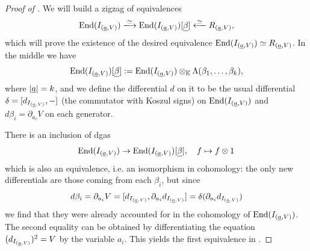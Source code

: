 \begin{proof}[Proof of ]
	We will build a zigzag of equivalences
	\begin{equation} \label{eqn:zigzag}
		 \End(I_{(\undl{a}, V)}) \xlra{\simeq} \End(I_{(\undl{a}, V)})[\undl{\beta}] \xlla{\simeq} R_{(\undl{a}, V)},
	\end{equation}
	which will prove the existence of the desired equivalence $\mathrm{End}(I_{(\underline{a}, V)}) \simeq R_{(\underline{a}, V)}$. In the middle we have
	\begin{equation*}
		\mathrm{End}(I_{(\underline{a}, V)})[\underline{\beta}] := \mathrm{End}(I_{(\underline{a}, V)}) \otimes_{\mathbb{K}} \Lambda(\beta_1, \dotsc, \beta_k),
	\end{equation*}
	where $\left\lvert \underline{a} \right\rvert = k$, and we define the differential $d$ on it to be the usual differential $\delta = [d_{I_{(\underline{a},V)}}, -]$ (the commutator with Koszul signs) on $\mathrm{End}(I_{(\underline{a}, V)})$ and $d\beta_i = \partial_{a_i} V$ on each generator.
	
	There is an inclusion of dgas
	\begin{equation*}
		\mathrm{End}(I_{(\underline{a}, V)}) \to \mathrm{End}(I_{(\underline{a}, V)})[\underline{\beta}], \quad f \mapsto f \otimes 1
	\end{equation*}
	which is also an equivalence, i.e. an isomorphism in cohomology: the only new differentials are those coming from each $\beta_i$, but since
	\begin{equation*}
		d \beta_i = \partial_{a_i} V = [d_{I_{(\underline{a},V)}}, \partial_{a_i} d_{I_{(\underline{a},V)}}] = \delta( \partial_{a_i} d_{I_{(\underline{a},V)}} )
	\end{equation*}
	we find that they were already accounted for in the cohomology of $\mathrm{End}(I_{(\underline{a}, V)})$. The second equality can be obtained by differentiating the equation $(d_{I_{(\underline{a},V)}})^2 = V$ by the variable $a_i$. This yields the first equivalence in .
	

\end{proof}
